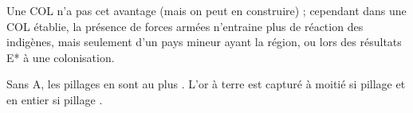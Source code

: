 \aparag Une COL n'a pas cet avantage (mais on peut en construire) ;
cependant dans une COL établie, la présence de forces armées 
n'entraine plus de réaction des indigènes, mais
seulement d'un pays mineur ayant la région, ou lors des 
résultats E* à une colonisation.

\aparag[Pillages]
\bparag Sans A, les pillages en \ROTW sont au plus \Facemoins.
\bparag L'or à terre est capturé à moitié si pillage \Facemoins et en
entier si pillage \Faceplus.





